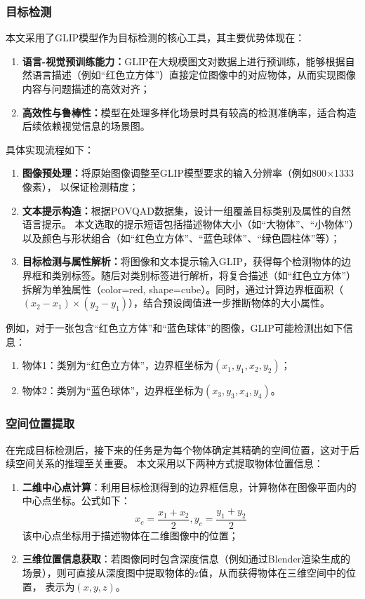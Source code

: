 \subsubsection{目标检测}
本文采用了GLIP模型作为目标检测的核心工具，其主要优势体现在：
\begin{enumerate}[nosep] 
\item \textbf{语言-视觉预训练能力：}GLIP在大规模图文对数据上进行预训练，能够根据自然语言描述（例如“红色立方体”）直接定位图像中的对应物体，从而实现图像内容与问题描述的高效对齐； 
\item \textbf{高效性与鲁棒性：}模型在处理多样化场景时具有较高的检测准确率，适合构造后续依赖视觉信息的场景图。 
\end{enumerate}

具体实现流程如下：
\begin{enumerate}[nosep] 
\item \textbf{图像预处理：}将原始图像调整至GLIP模型要求的输入分辨率（例如800$\times$1333像素），
以保证检测精度； 
\item \textbf{文本提示构造：}根据POVQAD数据集，设计一组覆盖目标类别及属性的自然语言提示。
本文选取的提示短语包括描述物体大小（如“大物体”、“小物体”）以及颜色与形状组合（如“红色立方体”、“蓝色球体”、“绿色圆柱体”等）； 
\item \textbf{目标检测与属性解析：}将图像和文本提示输入GLIP，获得每个检测物体的边界框和类别标签。随后对类别标签进行解析，将复合描述（如“红色立方体”）拆解为单独属性（color=red, shape=cube）。同时，通过计算边界框面积（$(x_2 - x_1)\times(y_2 - y_1)$），结合预设阈值进一步推断物体的大小属性。 
\end{enumerate}

例如，对于一张包含“红色立方体”和“蓝色球体”的图像，GLIP可能检测出如下信息： 
\begin{enumerate}[nosep] 
\item 物体1：类别为“红色立方体”，边界框坐标为$(x_1, y_1, x_2, y_2)$； 
\item 物体2：类别为“蓝色球体”，边界框坐标为$(x_3, y_3, x_4, y_4)$。 
\end{enumerate}
\subsubsection{空间位置提取}
在完成目标检测后，接下来的任务是为每个物体确定其精确的空间位置，这对于后续空间关系的推理至关重要。
本文采用以下两种方式提取物体位置信息：
\begin{enumerate}[nosep]
\item \textbf{二维中心点计算}：利用目标检测得到的边界框信息，计算物体在图像平面内的中心点坐标。公式如下：
$$x_c = \frac{x_1+x_2}{2}, y_c = \frac{y_1 + y_2}{2}$$
该中心点坐标用于描述物体在二维图像中的位置；
\item \textbf{三维位置信息获取}：若图像同时包含深度信息（例如通过Blender渲染生成的场景），则可直接从深度图中提取物体的z值，从而获得物体在三维空间中的位置，
表示为$(x, y, z)$。
\end{enumerate}

